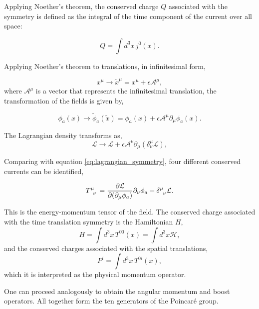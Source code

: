 \documentclass[11pt,a4paper,twoside,pdf]{article}
\numberwithin{equation}{section}
\begin{document}
Applying Noether's theorem, the conserved charge \(Q\) associated with the symmetry is 
defined as the integral of the time component of the current over all space:

\begin{equation}
    Q = \int d^3x \, j^0(x).
\end{equation}

Applying Noether's theorem to translations, in infinitesimal form, 

\begin{equation}
    x^\mu \to \tilde{x}^{\mu} = x^\mu + \epsilon \mathcal{A}^\mu,
\end{equation}
where \(\mathcal{A}^\mu\) is a vector that represents the infinitesimal translation, 
the transformation of the fields is given by,

\begin{equation}
    \phi_a(x) \to \tilde{\phi}_a(\tilde{x}) = \phi_a(x) + \epsilon \mathcal{A}^\mu 
    \partial_\mu \phi_a(x).
\end{equation}

The Lagrangian density transforms as,
\begin{equation}
    \mathcal{L} \to \mathcal{L} + \epsilon \mathcal{A}^\nu \partial_\mu 
    \left(\delta_\nu^\mu \mathcal{L}\right),
\end{equation}

Comparing with equation \eqref{eq:lagrangian_symmetry}, four different conserved
currents can be identified,

\begin{equation}
    \tensor{T}{^\mu_\nu} = \frac{\partial \mathcal{L}}{\partial (\partial_\mu \phi_a)} 
    \partial_\nu \phi_a - \tensor{\delta}{^\mu_\nu} \mathcal{L}.
\end{equation}

This is the energy-momentum tensor of the field. The conserved charge associated with
the time translation symmetry is the Hamiltonian \(H\), 
\begin{equation}
    H = \int d^3x \, T^{00}(x) = \int d^3x \mathcal{H},
    \label{eq:energy_momentum_hamiltonian}
\end{equation}  
and the conserved charges associated with the spatial translations,
\begin{equation}
    P^i = \int d^3x \, T^{0i}(x),
\end{equation}
which it is interpreted as the physical momentum operator.

One can proceed analogously to obtain the angular momentum and boost operators. All 
together form the ten generators of the Poincaré group.
\end{document}
